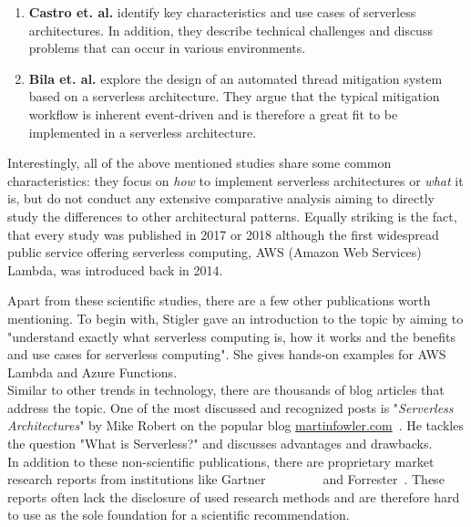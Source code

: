 \begin{enumerate}
    \item 
        \textbf{Castro et. al.} identify key characteristics and use cases of serverless architectures. In addition, they describe technical challenges and discuss problems that can occur in various environments.~
    \item
        \textbf{Bila et. al.} explore the design of an automated thread mitigation system based on a serverless architecture. They argue that the typical mitigation workflow is inherent event-driven and is therefore a great fit to be implemented in a serverless architecture.  ~
\end{enumerate}

Interestingly, all of the above mentioned studies share some common characteristics: they focus on \textit{how} to implement serverless architectures or \textit{what} it is, but do not conduct any extensive comparative analysis aiming to directly study the differences to other architectural patterns. Equally striking is the fact, that every study was published in 2017 or 2018 although the first widespread public service offering serverless computing, AWS (Amazon Web Services) Lambda, was introduced back in 2014.~

Apart from these scientific studies, there are a few other publications worth mentioning. To begin with, Stigler gave an introduction to the topic by aiming to "understand exactly what serverless computing is, how it works and the benefits and use cases for serverless computing". She gives hands-on examples for AWS Lambda and Azure Functions.~\\
Similar to other trends in technology, there are thousands of blog articles that address the topic. One of the most discussed and recognized posts is "\textit{Serverless Architectures}" by Mike Robert on the popular blog \url{martinfowler.com}~. He tackles the question "What is Serverless?" and discusses advantages and drawbacks. \\
In addition to these non-scientific publications, there are proprietary market research reports from institutions like Gartner
~\highcomma
~\highcomma
~\highcomma
~\highcomma
~
and Forrester~. These reports often lack the disclosure of used research methods and are therefore hard to use as the sole foundation for a scientific recommendation. 

